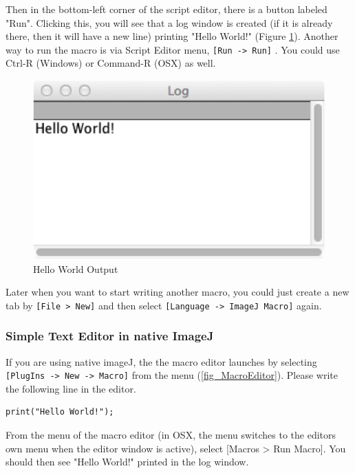 \documentclass[11pt,a4paper,oneside]{report}
\newcommand{\ijmenu}[1]{\texttt{\small#1}}
\begin{document}
Then in the bottom-left corner of the script editor, there is a button labeled "Run". Clicking this, you will see that a log window is created (if it is already there, then it will have a new line) printing "Hello World!" (Figure \ref{fig_HelloWorldLog}). Another way to run the macro is via Script Editor menu,  \ijmenu{[Run -> Run]} . You could use Ctrl-R (Windows) or Command-R (OSX) as well.  

\begin{figure}[hbtp]
\begin{center}
\includegraphics[scale=1.0]{fig/helloworld_logwindow.png}
\caption{Hello World Output} \label{fig_HelloWorldLog}
\end{center}
\end{figure}

Later when you want to start writing another macro, you could just create a new tab by \ijmenu{[File > New]} and then select \ijmenu{[Language -> ImageJ Macro]} again.

\subsubsection{Simple Text Editor in native ImageJ}
\label{part:nativeeditor}

If you are using native imageJ, the the macro editor launches by selecting \ijmenu{[PlugIns -> New -> Macro]} from the menu (\ref{fig_MacroEditor}). 
Please write the following line in the editor. 
\begin{lstlisting}[numbers=none]
print("Hello World!");
\end{lstlisting}
From the menu of the macro editor (in OSX, the menu switches to the editors own menu when the editor window is active), select [Macros > Run Macro]. You should then see "Hello World!" printed in the log window. 
\end{document}
